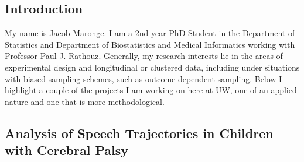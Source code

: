\documentclass[12pt]{article}
\begin{document}
\begin{multicols}{2} 

\subsection*{Introduction}
My name is Jacob Maronge. I am a 2nd year PhD Student in the Department of Statistics and Department of Biostatistics and Medical Informatics working with Professor Paul J. Rathouz. Generally, my research interests lie in the areas of experimental design and longitudinal or clustered data, including under situations with biased sampling schemes, such as outcome dependent sampling. Below I highlight a couple of the projects I am working on here at UW, one of an applied nature and one that is more methodological.

\subsection*{Analysis of Speech Trajectories in Children with Cerebral Palsy}


\end{multicols}
\end{document}
